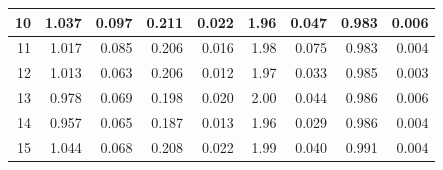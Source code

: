 \documentclass[
]{article}
\begin{document}
\begin{table}
\begin{tabular}[t]{r|r|r|r|r|r|r|r|r}
\hline
\hspace{1em}10 & 1.037 & 0.097 & 0.211 & 0.022 & 1.96 & 0.047 & 0.983 & 0.006\\
\hline
\hspace{1em}11 & 1.017 & 0.085 & 0.206 & 0.016 & 1.98 & 0.075 & 0.983 & 0.004\\
\hline
\hspace{1em}12 & 1.013 & 0.063 & 0.206 & 0.012 & 1.97 & 0.033 & 0.985 & 0.003\\
\hline
\hspace{1em}13 & 0.978 & 0.069 & 0.198 & 0.020 & 2.00 & 0.044 & 0.986 & 0.006\\
\hline
\hspace{1em}14 & 0.957 & 0.065 & 0.187 & 0.013 & 1.96 & 0.029 & 0.986 & 0.004\\
\hline
\hspace{1em}15 & 1.044 & 0.068 & 0.208 & 0.022 & 1.99 & 0.040 & 0.991 & 0.004\\
\hline
\end{tabular}
\end{table}
\end{document}
